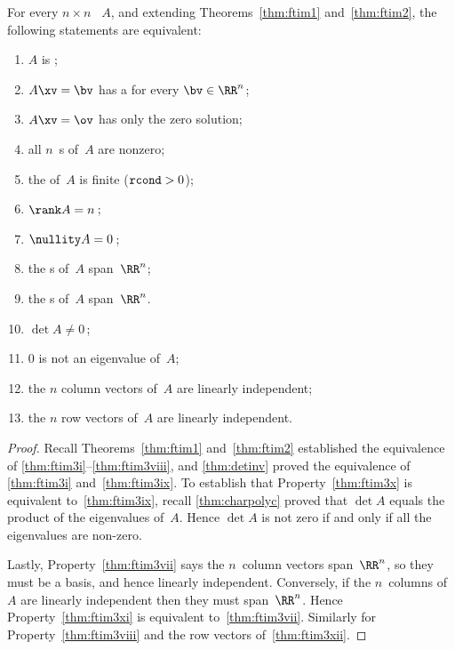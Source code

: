 \begin{theorem} \label{thm:ftim3} 
For every \(n\times n\) ~\(A\), and  
extending Theorems~\ref{thm:ftim1} and~\ref{thm:ftim2}, the following statements are equivalent:
\begin{enumerate}
\item\label{thm:ftim3i} \(A\) is ;
\item\label{thm:ftim3ii} \(A\xv=\bv\) has a  for every \(\bv\in\RR^n\);
\item\label{thm:ftim3iii} \(A\xv=\ov\) has only the zero solution;
\item\label{thm:ftim3iv} all \(n\)~s of~\(A\) are nonzero;
\item\label{thm:ftim3ivx} the  of~\(A\) is finite (\(\verb|rcond|>0\));
\item\label{thm:ftim3v} \(\rank A=n\)\,;
\item\label{thm:ftim3vi} \(\nullity A=0\)\,;
\item\label{thm:ftim3vii} the s of~\(A\) span~\(\RR^n\);
\item\label{thm:ftim3viii} the s of~\(A\) span~\(\RR^n\).
\item\label{thm:ftim3ix} \(\det A\neq 0\)\,;
\item\label{thm:ftim3x} \(0\) is not an eigenvalue of~\(A\);
\item\label{thm:ftim3xi} the \(n\) column vectors of~\(A\) are linearly independent;
\item\label{thm:ftim3xii} the \(n\) row vectors of~\(A\) are linearly independent.
\end{enumerate}
\end{theorem}
\begin{proof} 
Recall Theorems~\ref{thm:ftim1} and~\ref{thm:ftim2} established the equivalence of \ref{thm:ftim3i}--\ref{thm:ftim3viii}, and \autoref{thm:detinv} proved the equivalence of \ref{thm:ftim3i} and~\ref{thm:ftim3ix}.
To establish that Property~\ref{thm:ftim3x} is equivalent to~\ref{thm:ftim3ix}, recall \autoref{thm:charpolyc} proved that \(\det A\) equals the product of the eigenvalues of~\(A\). 
Hence  \(\det A\) is not zero if and only if all the eigenvalues are non-zero.  

Lastly, Property~\ref{thm:ftim3vii} says the \(n\)~column vectors span~\(\RR^n\), so they must be a basis, and hence linearly independent.
Conversely, if the \(n\)~columns of~\(A\) are linearly independent then they must span~\(\RR^n\).  
Hence Property~\ref{thm:ftim3xi} is equivalent to~\ref{thm:ftim3vii}.
Similarly  for Property~\ref{thm:ftim3viii} and the row vectors of~\ref{thm:ftim3xii}.
\end{proof}









